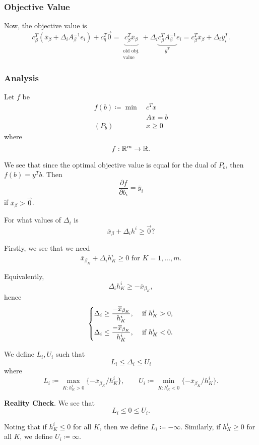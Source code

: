 \subsubsection{Objective Value}
Now, the objective value is
\[
	c_{\beta}^{T}(\overline{x}_{\beta}+\Delta_{i}A_{\beta}^{-1}e_{i})+ c_{\eta}^{T}\vec{0} = \underbrace{c_{\beta}^{T}\overline{x}_{\beta}}_{\substack{\text{old obj.}\\\text{value}}}+\Delta_{i}\underbrace{c_{\beta}^{T}A_{\beta}^{-1}}_{\overline{y}^{T}}e_{i} = c_{\beta}^{T}\overline{x}_{\beta}+\Delta_{i}\overline{y}^{T}_i.
\]

\subsubsection{Analysis}
Let \(f\) be
\begin{align*}
	f(b)\coloneqq \min~ & c^Tx    \\
	                    & Ax = b  \\
	(P_b)\quad          & x\geq 0
\end{align*}
where
\[
	f: \mathbb{\MakeUppercase{R}}^{m}\to \mathbb{\MakeUppercase{R}}.
\]

We see that since the optimal objective value is equal for the dual of \(P_b\), then \(f(b) = y^{T}b\). Then
\[
	\frac{\partial f}{\partial b_{i}} = \overline{y}_i
\]
if \(\overline{x}_{\beta}>\vec{0}\).

\begin{problem}
For what values of \(\Delta_{i}\) is
\[
	\overline{x}_{\beta} + \Delta_{i}h^i \geq \vec{0}?
\]
\end{problem}
\begin{answer}
	Firstly, we see that we need
	\[
		\overline{x}_{\beta_K}+\Delta_{i}h^i_K \geq 0 \text{ for }K = 1, \ldots , m.
	\]

	Equivalently,
	\[
		\Delta_{i}h^i_K \geq -\overline{x}_{\beta_K},
	\]
	hence
	\[
		\begin{dcases}
			\Delta_{i}\geq \frac{-\overline{x}_{\beta_K}}{h^i_K}, & \text{ if }h^i_K>0, \\
			\Delta_{i}\leq \frac{-\overline{x}_{\beta_K}}{h^i_K}, & \text{ if }h^i_K<0.
		\end{dcases}
	\]

	We define \(L_{i}, U_{i}\) such that
	\[
		L_{i}\leq \Delta_{i}\leq U_{i}
	\]
	where
	\[
		L_{i} \coloneqq \max_{K\colon h^i_K > 0}\{-\overline{x}_{\beta_K}/h^i_K\},\qquad U_{i} \coloneqq \min_{K\colon h^i_K < 0}\{-\overline{x}_{\beta_K}/h^i_K\}.
	\]

	\textbf{Reality Check}. We see that
	\[
		L_{i}\leq 0\leq U_{i}.
	\]

	\begin{remark}
		Noting that if \(h^i_K\leq 0\) for all \(K\), then we define \(L_{i} \coloneqq -\infty \). Similarly, if \(h^i_K\geq 0\) for all \(K\), we define \(U_i \coloneqq \infty \).
	\end{remark}
\end{answer}

